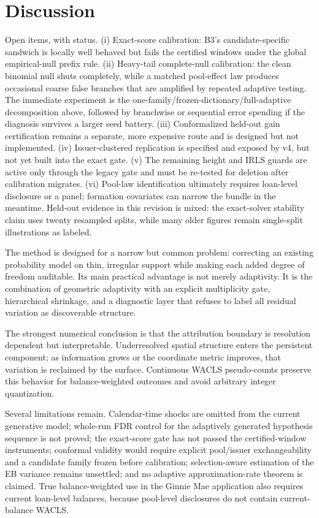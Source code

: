 \documentclass[11pt]{article}
\begin{document}
\section{Discussion}\label{sec:discussion}

Open items, with status. (i) Exact-score calibration: B3's candidate-specific
sandwich is locally well behaved but fails the certified windows under the global
empirical-null prefix rule. (ii) Heavy-tail complete-null calibration: the clean binomial
null shuts completely, while a matched pool-effect law produces occasional coarse false
branches that are amplified by repeated adaptive testing. The immediate experiment is the
one-family/frozen-dictionary/full-adaptive decomposition above, followed by branchwise or
sequential error spending if the diagnosis survives a larger seed battery. (iii)
Conformalized held-out gain certification remains a separate, more expensive route and is
designed but not implemented. (iv) Issuer-clustered replication is specified and exposed
by v4, but not yet built into the exact gate. (v) The remaining height and IRLS guards are
active only through the legacy gate and must be re-tested for deletion after calibration
migrates. (vi) Pool-law identification ultimately requires loan-level disclosure or a
panel; formation covariates can narrow the bundle in the meantime. Held-out evidence in
this revision is mixed: the exact-solver stability claim uses twenty resampled splits,
while many older figures remain single-split illustrations as labeled.

The method is designed for a narrow but common problem: correcting an existing probability model on
thin, irregular support while making each added degree of freedom auditable. Its main practical
advantage is not merely adaptivity. It is the combination of geometric adaptivity with an explicit
multiplicity gate, hierarchical shrinkage, and a diagnostic layer that refuses to label all residual
variation as discoverable structure.

The strongest numerical conclusion is that the attribution boundary is resolution dependent but
interpretable. Underresolved spatial structure enters the persistent component; as information grows
or the coordinate metric improves, that variation is reclaimed by the surface. Continuous WACLS
pseudo-counts preserve this behavior for balance-weighted outcomes and avoid arbitrary integer
quantization.

Several limitations remain. Calendar-time shocks are omitted from the current generative model;
whole-run FDR control for the adaptively generated hypothesis sequence is not proved; the exact-score
gate has not passed the certified-window instruments; conformal validity would require explicit
pool/issuer exchangeability and a candidate family frozen before calibration; selection-aware
estimation of the EB variance remains unsettled; and no adaptive approximation-rate theorem is
claimed. True balance-weighted use in the Ginnie Mae application also requires current loan-level
balances, because pool-level disclosures do not contain current-balance WACLS.
\end{document}
